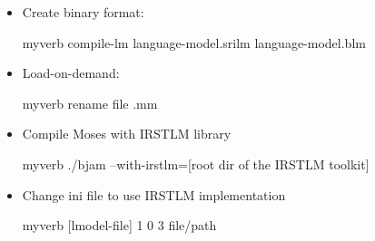 \documentclass[landscape]{uedslides2C}
\begin{document}

\vspace{20mm}
\begin{itemize}
\item Create binary format: \\
\begin{SaveVerbatim}{myverb} 
compile-lm language-model.srilm language-model.blm
\end{SaveVerbatim}
\colorbox{gray}{}

\item Load-on-demand: \\
\begin{SaveVerbatim}{myverb} 
rename file .mm  
\end{SaveVerbatim}
\colorbox{gray}{}
\end{itemize}


\vspace{20mm}
\begin{itemize}
\item Compile Moses with IRSTLM library \\
\begin{SaveVerbatim}{myverb} 
./bjam --with-irstlm=[root dir of the IRSTLM toolkit] 
\end{SaveVerbatim}
\colorbox{gray}{}

\item Change ini file to use IRSTLM implementation \\
\begin{SaveVerbatim}{myverb} 
[lmodel-file]
1 0 3 file/path
\end{SaveVerbatim}
\colorbox{gray}{}

\end{itemize}


\end{document}
